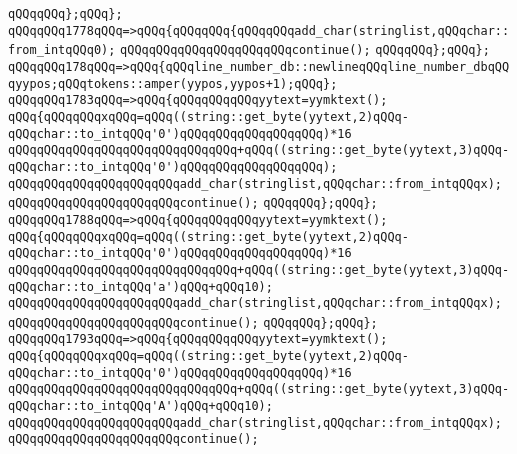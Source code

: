 \verb|qQQqqQQq};qQQq};|\newline
\verb|qQQqqQQq1778qQQq=>qQQq{qQQqqQQq{qQQqqQQqadd_char(stringlist,qQQqchar::from_intqQQq0);|\newline
\verb|qQQqqQQqqQQqqQQqqQQqqQQqcontinue();|\newline
\verb|qQQqqQQq};qQQq};|\newline
\verb|qQQqqQQq178qQQq=>qQQq{qQQqline_number_db::newlineqQQqline_number_dbqQQqyypos;qQQqtokens::amper(yypos,yypos+1);qQQq};|\newline
\verb|qQQqqQQq1783qQQq=>qQQq{qQQqqQQqqQQqyytext=yymktext();|\newline
\verb|qQQq{qQQqqQQqxqQQq=qQQq((string::get_byte(yytext,2)qQQq-qQQqchar::to_intqQQq'0')qQQqqQQqqQQqqQQqqQQq)*16|\newline
\verb|qQQqqQQqqQQqqQQqqQQqqQQqqQQqqQQq+qQQq((string::get_byte(yytext,3)qQQq-qQQqchar::to_intqQQq'0')qQQqqQQqqQQqqQQqqQQq);|\newline
\verb|qQQqqQQqqQQqqQQqqQQqqQQqadd_char(stringlist,qQQqchar::from_intqQQqx);|\newline
\verb|qQQqqQQqqQQqqQQqqQQqqQQqcontinue();|\newline
\verb|qQQqqQQq};qQQq};|\newline
\verb|qQQqqQQq1788qQQq=>qQQq{qQQqqQQqqQQqyytext=yymktext();|\newline
\verb|qQQq{qQQqqQQqxqQQq=qQQq((string::get_byte(yytext,2)qQQq-qQQqchar::to_intqQQq'0')qQQqqQQqqQQqqQQqqQQq)*16|\newline
\verb|qQQqqQQqqQQqqQQqqQQqqQQqqQQqqQQq+qQQq((string::get_byte(yytext,3)qQQq-qQQqchar::to_intqQQq'a')qQQq+qQQq10);|\newline
\verb|qQQqqQQqqQQqqQQqqQQqqQQqadd_char(stringlist,qQQqchar::from_intqQQqx);|\newline
\verb|qQQqqQQqqQQqqQQqqQQqqQQqcontinue();|\newline
\verb|qQQqqQQq};qQQq};|\newline
\verb|qQQqqQQq1793qQQq=>qQQq{qQQqqQQqqQQqyytext=yymktext();|\newline
\verb|qQQq{qQQqqQQqxqQQq=qQQq((string::get_byte(yytext,2)qQQq-qQQqchar::to_intqQQq'0')qQQqqQQqqQQqqQQqqQQq)*16|\newline
\verb|qQQqqQQqqQQqqQQqqQQqqQQqqQQqqQQq+qQQq((string::get_byte(yytext,3)qQQq-qQQqchar::to_intqQQq'A')qQQq+qQQq10);|\newline
\verb|qQQqqQQqqQQqqQQqqQQqqQQqadd_char(stringlist,qQQqchar::from_intqQQqx);|\newline
\verb|qQQqqQQqqQQqqQQqqQQqqQQqcontinue();|\newline
